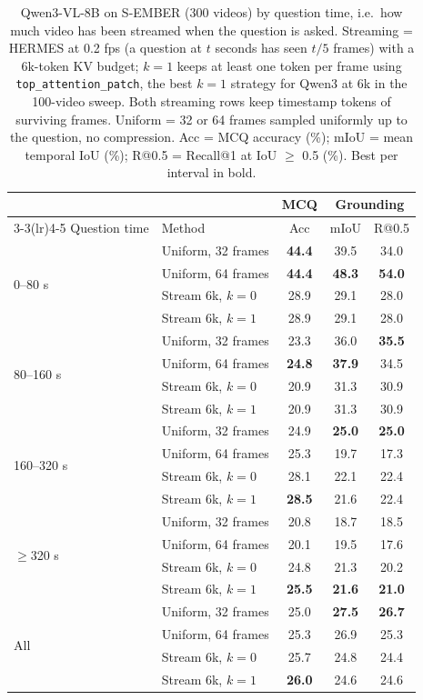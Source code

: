 \begin{table}[t]
\centering
\small
\caption{Qwen3-VL-8B on S-EMBER (300 videos) by question time, i.e.\ how much video has been streamed when the question is asked. Streaming = HERMES at 0.2 fps (a question at $t$ seconds has seen $t/5$ frames) with a 6k-token KV budget; $k{=}1$ keeps at least one token per frame using \texttt{top\_attention\_patch}, the best $k{=}1$ strategy for Qwen3 at 6k in the 100-video sweep. Both streaming rows keep timestamp tokens of surviving frames. Uniform = 32 or 64 frames sampled uniformly up to the question, no compression. Acc = MCQ accuracy (\%); mIoU = mean temporal IoU (\%); R@0.5 = Recall@1 at IoU $\geq$ 0.5 (\%). Best per interval in bold.}
\label{tab:sember-time-breakdown}
\begin{tabular}{llccc}
\toprule
& & MCQ & \multicolumn{2}{c}{Grounding} \\
\cmidrule(lr){3-3}\cmidrule(lr){4-5}
Question time & Method & Acc & mIoU & R@0.5 \\
\midrule
\multirow{4}{*}{0--80 s} & Uniform, 32 frames & \textbf{44.4} & 39.5 & 34.0 \\
 & Uniform, 64 frames & \textbf{44.4} & \textbf{48.3} & \textbf{54.0} \\
 & Stream 6k, $k{=}0$ & 28.9 & 29.1 & 28.0 \\
 & Stream 6k, $k{=}1$ & 28.9 & 29.1 & 28.0 \\
\midrule
\multirow{4}{*}{80--160 s} & Uniform, 32 frames & 23.3 & 36.0 & \textbf{35.5} \\
 & Uniform, 64 frames & \textbf{24.8} & \textbf{37.9} & 34.5 \\
 & Stream 6k, $k{=}0$ & 20.9 & 31.3 & 30.9 \\
 & Stream 6k, $k{=}1$ & 20.9 & 31.3 & 30.9 \\
\midrule
\multirow{4}{*}{160--320 s} & Uniform, 32 frames & 24.9 & \textbf{25.0} & \textbf{25.0} \\
 & Uniform, 64 frames & 25.3 & 19.7 & 17.3 \\
 & Stream 6k, $k{=}0$ & 28.1 & 22.1 & 22.4 \\
 & Stream 6k, $k{=}1$ & \textbf{28.5} & 21.6 & 22.4 \\
\midrule
\multirow{4}{*}{$\geq$320 s} & Uniform, 32 frames & 20.8 & 18.7 & 18.5 \\
 & Uniform, 64 frames & 20.1 & 19.5 & 17.6 \\
 & Stream 6k, $k{=}0$ & 24.8 & 21.3 & 20.2 \\
 & Stream 6k, $k{=}1$ & \textbf{25.5} & \textbf{21.6} & \textbf{21.0} \\
\midrule[\heavyrulewidth]
\multirow{4}{*}{All} & Uniform, 32 frames & 25.0 & \textbf{27.5} & \textbf{26.7} \\
 & Uniform, 64 frames & 25.3 & 26.9 & 25.3 \\
 & Stream 6k, $k{=}0$ & 25.7 & 24.8 & 24.4 \\
 & Stream 6k, $k{=}1$ & \textbf{26.0} & 24.6 & 24.6 \\
\bottomrule
\end{tabular}
\end{table}
